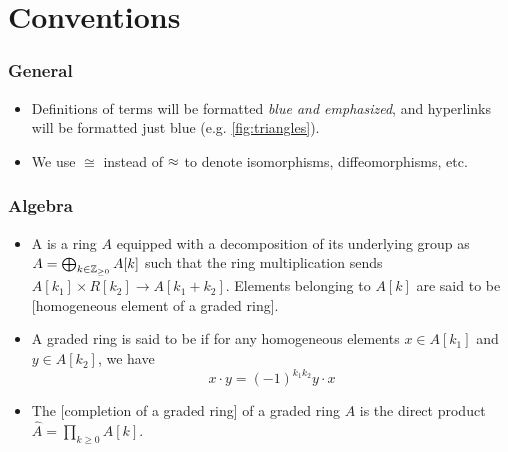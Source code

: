 \chapter*{Conventions}

\subsection*{General}

\begin{itemize}
  \item Definitions of terms will be formatted {\color{blue}\emph{blue and emphasized}}, and hyperlinks will be formatted just blue (e.g. \cref{fig:triangles}).
  \item We use $\cong$ instead of $\oldcong$ to denote isomorphisms, diffeomorphisms, etc.
\end{itemize}

\subsection*{Algebra}

\begin{itemize}
  \item A  is a ring $A$ equipped with a decomposition of its underlying group as $A=\bigoplus_{k\in \mathbb{Z}_{\geq 0}} A[k]$ such that the ring multiplication sends $A[k_1]\times R[k_2] \to A[k_1+k_2]$. Elements belonging to $A[k]$ are said to be [homogeneous element of a graded ring]. 
  \item A graded ring is said to be  if for any homogeneous elements $x\in A[k_1]$ and $y\in A[k_2]$, we have
    \[
      x\cdot y = (-1)^{k_1k_2} y\cdot x
    \]
  \item The [completion of a graded ring] of a graded ring $A$ is the direct product $\widehat{A} = \prod_{k\geq 0} A[k]$.
\end{itemize}

